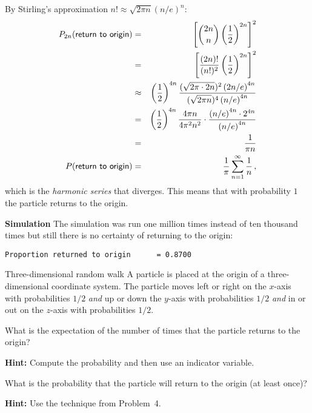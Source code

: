 By Stirling's approximation $n! \approx \sqrt{2\pi n}\left(n/e\right)^n$:
\begin{eqnarray*}
P_{2n}(\textsf{return to origin}) &=&
\left[\displaystyle{2n \choose n}
\left(\displaystyle\frac{1}{2}\right)^{2n}\right]^2 \\
&=&
\left[\displaystyle\frac{(2n)!}{(n!)^2}
\left(\displaystyle\frac{1}{2}\right)^{2n}\right]^2 \\
&\approx&
\left(\displaystyle\frac{1}{2}\right)^{4n}
\displaystyle\frac{(\sqrt{2\pi \cdot 2n})^2
         \left(2n/e\right)^{4n}}{(\sqrt{2\pi n})^{4}
         \left(n/e\right)^{4n}} \\
&=&\left(\displaystyle\frac{1}{2}\right)^{4n}\displaystyle\frac{4\pi n}{4\pi^2 n^2}\cdot
\displaystyle\frac{\left(n/e\right)^{4n}\cdot 2^{4n}}{\left(n/e\right)^{4n}}\\
&=& \displaystyle\frac{1}{\pi n}\\
P(\textsf{return to origin}) &=& \displaystyle\frac{1}{\pi}\sum_{n=1}^{\infty}\displaystyle\frac{1}{n}\,,
\end{eqnarray*}
which is the \emph{harmonic series} that diverges. This means that with probability $1$ the particle returns to the origin.

\textbf{Simulation}
The simulation was run one million times instead of ten thousand times but still there is no certainty of returning to the origin:
\begin{verbatim}
Proportion returned to origin      = 0.8700
\end{verbatim}


\begin{prob}{Three-dimensional random walk}
A particle is placed at the origin of a three-dimensional coordinate system. The particle moves left or right on the $x$-axis with probabilities $1/2$ \emph{and} up or down the $y$-axis with probabilities $1/2$ \emph{and} in or out on the $z$-axis with probabilities $1/2$.

 What is the expectation of the number of times that the particle returns to the origin?

\textbf{Hint:} Compute the probability and then use an indicator variable.

 What is the probability that the particle will return to the origin (at least once)?

\textbf{Hint:} Use the technique from Problem~4.
\end{prob}

\solution{}

